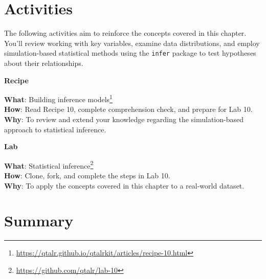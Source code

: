 \documentclass[
  letterpaper,
]{latex/krantz}
\theoremstyle{definition}
\theoremstyle{remark}
\DeclareRobustCommand{\href}[2]{#2\footnote{\url{#1}}}
\begin{document}
\section*{Activities}\label{activities-8}


The following activities aim to reinforce the concepts covered in this
chapter. You'll review working with key variables, examine data
distributions, and employ simulation-based statistical methods using the
\texttt{infer} package to test hypotheses about their relationships.

\begin{tcolorbox}[enhanced jigsaw, colback=white, colframe=quarto-callout-color-frame, leftrule=.75mm, opacityback=0, rightrule=.15mm, bottomrule=.15mm, toprule=.15mm, breakable, left=2mm, arc=.35mm]

\textbf{ Recipe}

\textbf{What}:
\href{https://qtalr.github.io/qtalrkit/articles/recipe-10.html}{Building
inference models}\\
\textbf{How}: Read Recipe 10, complete comprehension check, and prepare
for Lab 10.\\
\textbf{Why}: To review and extend your knowledge regarding the
simulation-based approach to statistical inference.

\end{tcolorbox}

\begin{tcolorbox}[enhanced jigsaw, colback=white, colframe=quarto-callout-color-frame, leftrule=.75mm, opacityback=0, rightrule=.15mm, bottomrule=.15mm, toprule=.15mm, breakable, left=2mm, arc=.35mm]

\textbf{ Lab}

\textbf{What}: \href{https://github.com/qtalr/lab-10}{Statistical
inference}\\
\textbf{How}: Clone, fork, and complete the steps in Lab 10.\\
\textbf{Why}: To apply the concepts covered in this chapter to a
real-world dataset.

\end{tcolorbox}

\section*{Summary}\label{summary-9}
\end{document}

